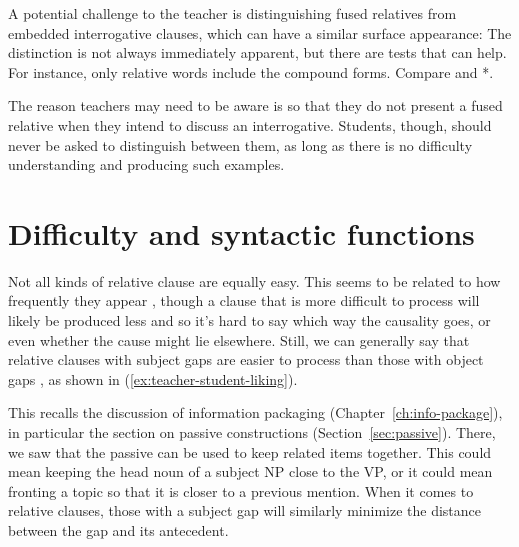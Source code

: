 A potential challenge to the teacher is distinguishing fused relatives from embedded interrogative clauses, which can have a similar surface appearance:
\ea \label{ex:14.14}
    \z
\z
The distinction is not always immediately apparent, but there are tests that can help. For instance, only relative words include the compound  forms. Compare  and *.

The reason teachers may need to be aware is so that they do not present a fused relative when they intend to discuss an interrogative. Students, though, should never be asked to distinguish between them, as long as there is no difficulty understanding and producing such examples.

\section{Difficulty and syntactic functions} \label{sec:difficulty-relatives}

Not all kinds of relative clause are equally easy. This seems to be related to how frequently they appear \citep{Reali2007}, though a clause that is more difficult to process will likely be produced less and so it's hard to say which way the causality goes, or even whether the cause might lie elsewhere. Still, we can generally say that relative clauses with subject gaps are easier to process than those with object gaps \citep{Lau2021}, as shown in (\ref{ex:teacher-student-liking}).

\ea \label{ex:teacher-student-liking}
    \z
\z
This recalls the discussion of information packaging (Chapter~\ref{ch:info-package}), in particular the section on passive constructions (Section~\ref{sec:passive}). There, we saw that the passive can be used to keep related items together. This could mean keeping the head noun of a subject NP close to the VP, or it could mean fronting a topic so that it is closer to a previous mention. When it comes to relative clauses, those with a subject gap will similarly minimize the distance between the gap and its antecedent.

